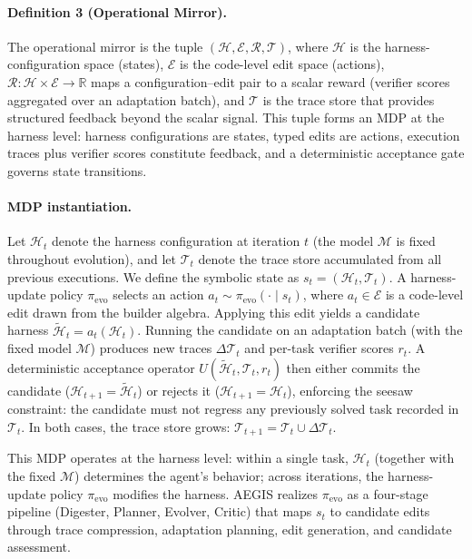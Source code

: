 \paragraph{Definition 3 (Operational Mirror).}
The operational mirror is the tuple $(\mathcal{H}, \mathcal{E}, \mathcal{R}, \mathcal{T})$, where $\mathcal{H}$ is the harness-configuration space (states), $\mathcal{E}$ is the code-level edit space (actions), $\mathcal{R}: \mathcal{H} \times \mathcal{E} \to \mathbb{R}$ maps a configuration--edit pair to a scalar reward (verifier scores aggregated over an adaptation batch), and $\mathcal{T}$ is the trace store that provides structured feedback beyond the scalar signal. This tuple forms an MDP at the harness level: harness configurations are states, typed edits are actions, execution traces plus verifier scores constitute feedback, and a deterministic acceptance gate governs state transitions.

\paragraph{MDP instantiation.}
Let $\mathcal{H}_t$ denote the harness configuration at iteration $t$ (the model $\mathcal{M}$ is fixed throughout evolution), and let
$\mathcal{T}_t$ denote the trace store accumulated from all previous executions. We
define the symbolic state as $s_t=(\mathcal{H}_t,\mathcal{T}_t)$. A harness-update
policy $\pi_{\mathrm{evo}}$ selects an action
$a_t \sim \pi_{\mathrm{evo}}(\cdot \mid s_t)$, where $a_t \in \mathcal{E}$ is a code-level edit drawn
from the builder algebra. Applying this edit yields a candidate harness
$\widetilde{\mathcal{H}}_{t}=a_t(\mathcal{H}_t)$. Running the candidate on an adaptation batch (with the fixed model $\mathcal{M}$) produces new traces $\Delta\mathcal{T}_t$ and per-task verifier scores $r_t$. A deterministic acceptance operator
$U(\widetilde{\mathcal{H}}_{t}, \mathcal{T}_t, r_t)$ then either commits the candidate
($\mathcal{H}_{t+1}=\widetilde{\mathcal{H}}_{t}$) or rejects it
($\mathcal{H}_{t+1}=\mathcal{H}_t$), enforcing the seesaw constraint: the candidate must not regress any previously solved task recorded in $\mathcal{T}_t$. In both cases, the trace store grows:
$\mathcal{T}_{t+1}=\mathcal{T}_t \cup \Delta\mathcal{T}_t$.

This MDP operates at the harness level: within a single task, $\mathcal{H}_t$ (together with the fixed $\mathcal{M}$) determines the agent's behavior; across iterations, the harness-update policy $\pi_{\mathrm{evo}}$ modifies the harness. AEGIS realizes $\pi_{\mathrm{evo}}$ as a four-stage pipeline (Digester, Planner, Evolver, Critic) that maps $s_t$ to candidate edits through trace compression, adaptation planning, edit generation, and candidate assessment.






